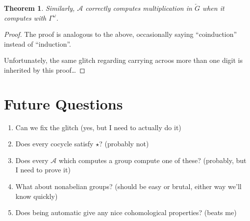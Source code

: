 \documentclass[12pt]{article}
\newtheorem{thm}{Theorem}
\theoremstyle{definition}
\begin{document}
  \begin{thm}
    Similarly, $\mathcal{A}$ correctly computes multiplication in 
    $\overleftarrow{G}$ when it computes with $\Gamma^\omega$.
  \end{thm}

  \begin{proof}
    The proof is analogous to the above, occasionally saying ``coinduction''
    instead of ``induction''.

    Unfortunately, the same glitch regarding carrying acroos more than one
    digit is inherited by this proof\ldots
  \end{proof}

  \section{Future Questions}
    \begin{enumerate}
      \item Can we fix the glitch (yes, but I need to actually do it)
      \item Does every cocycle satisfy $\star$? (probably not)
      \item Does every $\mathcal{A}$ which computes 
        a group compute one of these? (probably, but I need to prove it)
      \item What about nonabelian groups? (should be easy or brutal, either way we'll know quickly)
      \item Does being automatic give any nice cohomological properties? (beats me)
    \end{enumerate}
\end{document}
